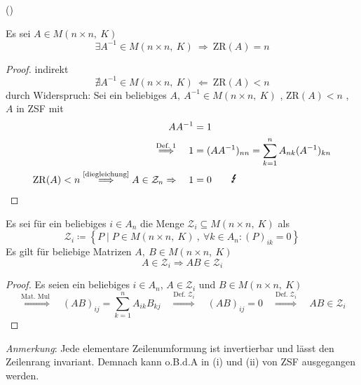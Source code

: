 \documentclass[a4paper, 12pt]{scrartcl}
\newcounter{taski}
\newcounter{taskii}[taski]
\newcounter{taskiii}[taskii]
\newcommand{\tttask}{\stepcounter{taskiii}\quad(\roman{taskiii})}
\newcommand{\defimpl}[1]{\stackrel{\text{Def.}\;#1}{\Longrightarrow}}
\newcommand{\txtimpl}[1]{\stackrel{\text{#1}}{\Longrightarrow}}
\newcommand{\refimpl}[1]{\txtimpl{\eqref{#1}}}
\begin{document}
\tttask
\begin{theorem}
Es sei $A \in M(n \times n,\ K)$
	\[ \exists A^{-1} \in M(n \times n,\ K) \ \Longrightarrow\ \mathrm{ZR}(A) = n \]
\end{theorem}
\begin{proof} indirekt
\[ \nexists A^{-1} \in M(n \times n,\ K) \ \Longleftarrow\ \mathrm{ZR}(A) < n \]
durch Widerspruch: Sei ein beliebiges $A,\ A^{-1} \in M(n \times n,\ K)$ , $\mathrm{ZR}(A) < n$ , $A$ in ZSF mit
\begin{align*}
	AA^{-1} &= 1 \\
	\defimpl{1} \quad 1 &= (AA^{-1})_{nn} = \sum_{k=1}^n A_{nk}(A^{-1})_{kn} \\
	\mathrm{ZR}(A) < n \refimpl{diegleichung} A \in \mathcal{Z}_n \Rightarrow \quad 1 &= 0 \qquad \text{\large \Lightning}
\end{align*}
\end{proof}
\begin{lemma}\label{daslemma}
	Es sei für ein beliebiges $i \in A_n$ die Menge $\mathcal{Z}_i \subseteq M(n \times n,\ K)$ als
	\[ \mathcal{Z}_i \coloneqq \left\{ P \mid P \in M(n \times n,\ K)\ ,\ \forall k \in A_n : (P)_{ik} = 0 \right\} \]
	Es gilt für beliebige Matrizen $A,\ B \in M(n \times n,\ K)$
	\[ A \in \mathcal{Z}_i \Rightarrow AB \in \mathcal{Z}_i \]
\end{lemma}
\begin{proof}
Es seien ein beliebiges $i \in A_n$, $A \in \mathcal{Z}_i$ und $B \in M(n \times n,\ K)$
\[ \txtimpl{Mat. Mul}\quad (AB)_{ij} = \sum_{k = 1}^n A_{ik}B_{kj} \quad\defimpl{\mathcal{Z}_i}\quad (AB)_{ij} = 0 \quad\defimpl{\mathcal{Z}_i}\quad AB \in \mathcal{Z}_i \]
\end{proof}
\emph{Anmerkung}: Jede elementare Zeilenumformung ist invertierbar und lässt den Zeilenrang invariant. Demnach kann o.B.d.A in (i) und (ii) von ZSF ausgegangen werden.
\end{document}
